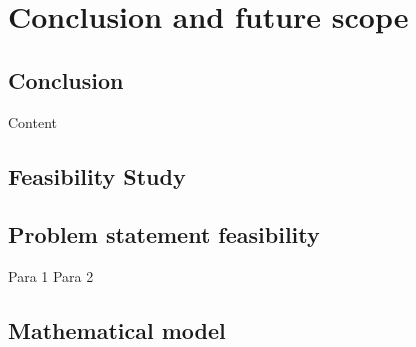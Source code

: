 \documentclass[oneside,a4paper,12pt, times]{book}
\begin{document}
 \chapter{Conclusion and future scope}
\section{Conclusion}
Content

% 




\begin{appendices}

\chapter{Feasibility Study}
\section{Problem statement feasibility}
\-\hspace{0.5in}Para 1
\-\hspace{0.5in}Para 2

\section{Mathematical model}


\end{appendices}
\end{document}
